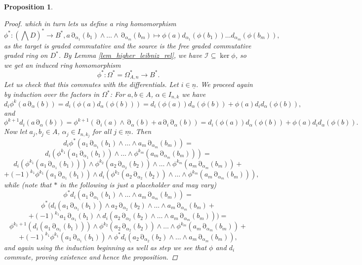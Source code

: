 \documentclass[10pt, a4paper, UKenglish]{article}
\numberwithin{equation}{section}
\newcommand{\ind}[1]{\underline{#1}}
\newcommand{\n}{\ind{n}}
\theoremstyle{plain}
\newtheorem{prop}[equation]{Proposition}
\theoremstyle{definition}
\renewcommand{\to}{\longrightarrow}
\renewcommand{\mapsto}{\longmapsto}
\newcommand{\del}{\operatorname{\partial}}
\begin{document}
\begin{prop}
\begin{proof}
which in turn lets us define a ring homomorphism
    \[ \phi ^*: (\bigwedge D)^* \to B^*, %
    a \del_{\alpha_1} (b_1) \wedge \ldots \wedge \del_{\alpha_m} (b_m) \mapsto%
    \phi(a) d_{\alpha_1} (\phi(b_1)) \ldots d_{\alpha_m} (\phi(b_m)), \]
as the target is graded commutative and the source is the free graded commutative graded ring on $D^*$.
By Lemma \ref{lem_higher_leibniz_rel}, we have $\mathcal{I} \subseteq \ker \phi$, so we get an induced ring homomorphism%
\[\phi^*: \Omega^* = \Omega^*_{A,n} \to B^*.\]
Let us check that this commutes with the differentials. Let $i \in \n$. We proceed again by induction over the factors in $\Omega^*$: For $a,b \in A$, $\alpha \in I_{n,k}$ we have
    \[ d_i \phi^k ( a \del_\alpha (b) ) = d_i (\phi(a) d_\alpha(\phi(b)) ) = %
    d_i (\phi(a)) d_\alpha(\phi(b)) + \phi(a) d_i d_\alpha (\phi(b)), \]
and
    \[ \phi^{k+1} d_i (a \del_\alpha (b)) = %
    \phi^{k+1} (\del_i (a) \wedge \del_\alpha (b) + a \del_i \del_\alpha (b) ) = %
    d_i (\phi(a)) d_\alpha(\phi(b)) + \phi(a) d_i d_\alpha (\phi(b)). \]
Now let $a_j, b_j \in A$, $\alpha_j \in I_{n,k_j}$ for all $j \in \ind{m}$.%
Then%
    \[ d_i \phi^* ( a_1 \del_{\alpha_1} (b_1) \wedge \ldots \wedge %
    a_m \del_{\alpha_m} (b_m) ) = \]%
    \[d_i ( \phi^{k_1}( a_1 \del_{\alpha_1} (b_1) ) \wedge \ldots \wedge %
    \phi^{k_m} ( a_m \del_{\alpha_m} (b_m) ) ) = \]%
    \[d_i ( \phi^{k_1}( a_1 \del_{\alpha_1} (b_1) ) ) \wedge %
    \phi^{k_2}( a_2 \del_{\alpha_2} (b_2) ) \wedge \ldots \wedge %
    \phi^{k_m}( a_m \del_{\alpha_m} (b_m) ) + \]%
    \[ + (-1)^{k_1} \phi^{k_1}( a_1 \del_{\alpha_1} (b_1) ) \wedge %
    d_i ( \phi^{k_2}( a_2 \del_{\alpha_2} (b_2) ) \wedge \ldots \wedge %
    \phi^{k_m}( a_m \del_{\alpha_m} (b_m) ) ),
    \]
while (note that $*$ in the following is just a placeholder and may vary)
    \[
    \phi^{*} d_i ( a_1 \del_{\alpha_1} (b_1) \wedge \ldots \wedge %
    a_m \del_{\alpha_m} (b_m) ) = \]%
    \[ \phi^{*} ( d_i ( a_1 \del_{\alpha_1} (b_1) ) \wedge a_2 \del_{\alpha_2} (b_2) \wedge \ldots \wedge a_m \del_{\alpha_m} (b_m) + \]%
    \[ + (-1)^{k_1} a_1 \del_{\alpha_1} (b_1) \wedge d_i (a_2 \del_{\alpha_2} (b_2) %
    \wedge \ldots \wedge a_m \del_{\alpha_m} (b_m)) ) = \]%
    \[\phi^{k_1+1} (d_i ( a_1 \del_{\alpha_1} (b_1) ) ) \wedge %
    \phi^{k_2}( a_2 \del_{\alpha_2} (b_2) ) \wedge \ldots \wedge %
    \phi^{k_m}( a_m \del_{\alpha_m} (b_m) ) + \]%
    \[ + (-1)^{k_1} \phi^{k_1}( a_1 \del_{\alpha_1} (b_1) ) \wedge \phi^* d_i (a_2 \del_{\alpha_2} (b_2) \wedge \ldots \wedge a_m \del_{\alpha_m} (b_m)), \]
and again using the induction beginning as well as step we see that $\phi$ and $d_i$ commute, proving existence and hence the proposition.
\end{proof}
\end{prop}
\end{document}
